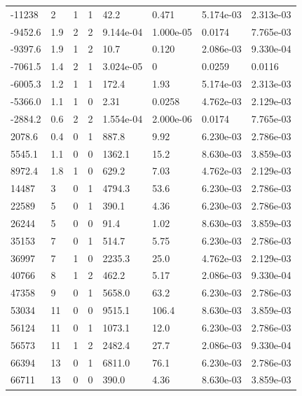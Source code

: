 \documentclass[preview]{standalone}
\begin{document}
{{\begin{tabular}{L{1.2cm}C{1.2cm} C{0.3cm}C{0.5cm} C{1.4cm}C{1.4cm} C{1.4cm}C{1.4cm}}
  -11238  &     2  & 1     &  1 &  42.2  & 0.471  & 5.174e-03 &  2.313e-03   \\ 
  -9452.6  &   1.9  & 2     &  2 &  9.144e-04  & 1.000e-05  & 0.0174 &  7.765e-03   \\ 
  -9397.6  &   1.9  & 1     &  2 &  10.7  & 0.120  & 2.086e-03 &  9.330e-04   \\ 
  -7061.5  &   1.4  & 2     &  1 &  3.024e-05  & 0  & 0.0259 &  0.0116   \\ 
  -6005.3  &   1.2  & 1     &  1 &  172.4  & 1.93  & 5.174e-03 &  2.313e-03   \\ 
  -5366.0  &   1.1  & 1     &  0 &  2.31  & 0.0258  & 4.762e-03 &  2.129e-03   \\ 
  -2884.2  &   0.6  & 2     &  2 &  1.554e-04  & 2.000e-06  & 0.0174 &  7.765e-03   \\ 
  2078.6  &   0.4  & 0     &  1 &  887.8  & 9.92  & 6.230e-03 &  2.786e-03   \\ 
  5545.1  &   1.1  & 0     &  0 &  1362.1  & 15.2  & 8.630e-03 &  3.859e-03   \\ 
  8972.4  &   1.8  & 1     &  0 &  629.2  & 7.03  & 4.762e-03 &  2.129e-03   \\ 
  14487  &     3  & 0     &  1 &  4794.3  & 53.6  & 6.230e-03 &  2.786e-03   \\ 
  22589  &     5  & 0     &  1 &  390.1  & 4.36  & 6.230e-03 &  2.786e-03   \\ 
  26244  &     5  & 0     &  0 &  91.4  & 1.02  & 8.630e-03 &  3.859e-03   \\ 
  35153  &     7  & 0     &  1 &  514.7  & 5.75  & 6.230e-03 &  2.786e-03   \\ 
  36997  &     7  & 1     &  0 &  2235.3  & 25.0  & 4.762e-03 &  2.129e-03   \\ 
  40766  &     8  & 1     &  2 &  462.2  & 5.17  & 2.086e-03 &  9.330e-04   \\ 
  47358  &     9  & 0     &  1 &  5658.0  & 63.2  & 6.230e-03 &  2.786e-03   \\ 
  53034  &    11  & 0     &  0 &  9515.1  & 106.4  & 8.630e-03 &  3.859e-03   \\ 
  56124  &    11  & 0     &  1 &  1073.1  & 12.0  & 6.230e-03 &  2.786e-03   \\ 
  56573  &    11  & 1     &  2 &  2482.4  & 27.7  & 2.086e-03 &  9.330e-04   \\ 
  66394  &    13  & 0     &  1 &  6811.0  & 76.1  & 6.230e-03 &  2.786e-03   \\ 
  66711  &    13  & 0     &  0 &  390.0  & 4.36  & 8.630e-03 &  3.859e-03   \\ 

\end{tabular}}}
\end{document}
